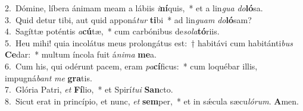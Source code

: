 {2.~}Dómine, líbera ánimam meam a lábiis \textit{i}\textbf{ní}quis,~* et a lin\textit{gua} \textit{do}\textbf{ló}sa.\\
{3.~}Quid detur tibi, aut quid apponá\textit{tur} \textbf{ti}bi~* ad lin\textit{guam} \textit{do}\textbf{ló}sam?\\
{4.~}Sagíttæ poténtis \textit{a}\textbf{cú}tæ,~* cum carbónibus de\textit{so}\textit{la}\textbf{tó}riis.\\
{5.~}Heu mihi! quia incolátus meus prolongátus est:~† habitávi cum habitánti\textit{bus} \textbf{Ce}dar:~* multum íncola fuit á\textit{ni}\textit{ma} \textbf{me}a.\\
{6.~}Cum his, qui odérunt pacem, eram \textit{pa}\textbf{cí}ficus:~* cum loquébar illis, impugná\textit{bant} \textit{me} \textbf{gra}tis.\\
{7.~}Glória Patri, \textit{et} \textbf{Fí}lio,~* et Spirí\textit{tu}\textit{i} \textbf{San}cto.\\
{8.~}Sicut erat in princípio, et nunc, \textit{et} \textbf{sem}per,~* et in sǽcula sæcu\textit{ló}\textit{rum}. \textbf{A}men.\\
